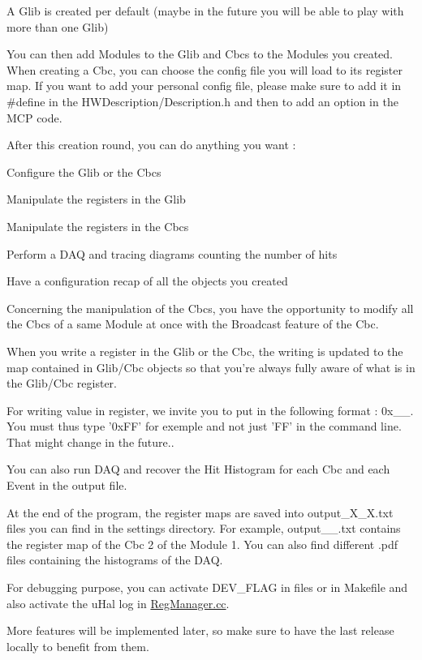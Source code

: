 A Glib is created per default (maybe in the future you will be able to play with more than one Glib)

You can then add Modules to the Glib and Cbcs to the Modules you created. When creating a Cbc, you can choose the config file you will load to its register map. If you want to add your personal config file, please make sure to add it in \#define in the H\-W\-Description/\-Description.\-h and then to add an option in the M\-C\-P code.

After this creation round, you can do anything you want \-:
\begin{DoxyItemize}
\item Configure the Glib or the Cbcs
\item Manipulate the registers in the Glib
\item Manipulate the registers in the Cbcs
\item Perform a D\-A\-Q and tracing diagrams counting the number of hits
\item Have a configuration recap of all the objects you created
\end{DoxyItemize}

Concerning the manipulation of the Cbcs, you have the opportunity to modify all the Cbcs of a same Module at once with the Broadcast feature of the Cbc.

When you write a register in the Glib or the Cbc, the writing is updated to the map contained in Glib/\-Cbc objects so that you're always fully aware of what is in the Glib/\-Cbc register.

For writing value in register, we invite you to put in the following format \-: 0x\-\_\-\-\_\-. You must thus type '0x\-F\-F' for exemple and not just 'F\-F' in the command line. That might change in the future..

You can also run D\-A\-Q and recover the Hit Histogram for each Cbc and each Event in the output file.

At the end of the program, the register maps are saved into output\-\_\-\-X\-\_\-\-X.\-txt files you can find in the settings directory. For example, output\-\_\-\_.\-txt contains the register map of the Cbc 2 of the Module 1. You can also find different .pdf files containing the histograms of the D\-A\-Q.

For debugging purpose, you can activate D\-E\-V\-\_\-\-F\-L\-A\-G in files or in Makefile and also activate the u\-Hal log in \hyperlink{_reg_manager_8cc}{Reg\-Manager.\-cc}.

More features will be implemented later, so make sure to have the last release locally to benefit from them.

